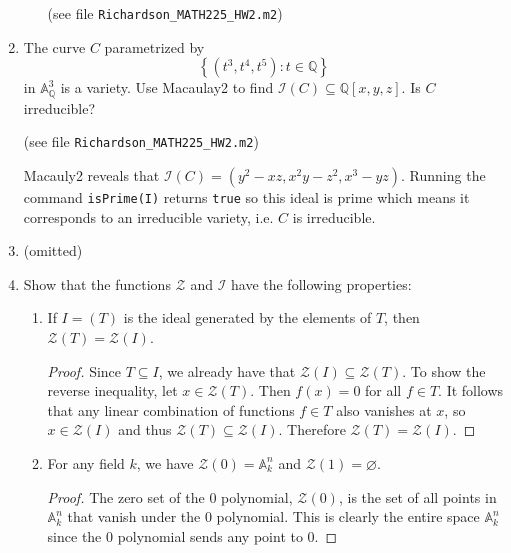 \documentclass[11pt,oneside,english]{amsart}
\theoremstyle{definition}
\newcommand{\MC}[1]{\mathcal{#1}}
\newcommand{\MB}[1]{\mathbb{#1}}
\begin{document}
\begin{enumerate}[leftmargin=*]
\begin{enumerate}
(see file \verb!Richardson_MATH225_HW2.m2!)
\end{enumerate}

\item The curve $C$ parametrized by 
\[
\left\{ (t^3,t^4,t^5): t \in \MB{Q} \right\}
\]
in $\MB{A}^3_{\MB{Q}}$ is a variety. Use Macaulay2 to find $\MC{I}(C) \subseteq \MB{Q}[x,y,z]$. Is $C$ irreducible?

(see file \verb!Richardson_MATH225_HW2.m2!)

Macauly2 reveals that $\MC{I}(C)=(y^2-xz,x^2y-z^2,x^3-yz)$. Running the command \verb!isPrime(I)! returns \verb!true! so this ideal is prime which means it corresponds to an irreducible variety, i.e. $C$ is irreducible.

\item (omitted) 	

\item Show that the functions $\MC{Z}$ and $\MC{I}$ have the following properties:
\begin{enumerate}
\item If $I=(T)$ is the ideal generated by the elements of $T$, then $\MC{Z}(T) = \MC{Z}(I)$.
\begin{proof}
Since $T\subseteq I$, we already have that $\MC{Z}(I)\subseteq\MC{Z}(T)$. To show the reverse inequality, let $x\in \MC{Z}(T)$. Then $f(x)=0$ for all $f\in T$. It follows that any linear combination of functions $f\in T$ also vanishes at $x$, so $x\in \MC{Z}(I)$ and thus $\MC{Z}(T)\subseteq\MC{Z}(I)$. Therefore $\MC{Z}(T) = \MC{Z}(I)$.
\end{proof}

\item For any field $k$, we have $\MC{Z}(0) = \MB{A}^n_k$ and $\MC{Z}(1) = \varnothing$.

\begin{proof}
The zero set of the 0 polynomial, $\MC{Z}(0)$, is the set of all points in $\MB{A}_k^n$ that vanish under the 0 polynomial. This is clearly the entire space $\MB{A}_k^n$ since the 0 polynomial sends any point to 0.


\end{proof}
\end{enumerate}
\end{enumerate}
\end{document}
